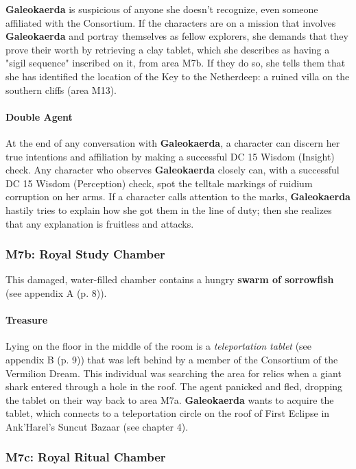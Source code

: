 \documentclass[a4paper, 11pt, bg=full, twocolumn, nooutline]{dndbook}
\begin{document}
\textbf{Galeokaerda} is suspicious of anyone she doesn't recognize, even someone affiliated with the Consortium. If the characters are on a mission that involves \textbf{Galeokaerda} and portray themselves as fellow explorers, she demands that they prove their worth by retrieving a clay tablet, which she describes as having a "sigil sequence" inscribed on it, from area M7b. If they do so, she tells them that she has identified the location of the Key to the Netherdeep: a ruined villa on the southern cliffs (area M13).

\paragraph{Double Agent}

At the end of any conversation with \textbf{Galeokaerda}, a character can discern her true intentions and affiliation by making a successful DC 15 Wisdom (Insight) check. Any character who observes \textbf{Galeokaerda} closely can, with a successful DC 15 Wisdom (Perception) check, spot the telltale markings of ruidium corruption on her arms. If a character calls attention to the marks, \textbf{Galeokaerda} hastily tries to explain how she got them in the line of duty; then she realizes that any explanation is fruitless and attacks.

\subsubsection{M7b: Royal Study Chamber}

This damaged, water-filled chamber contains a hungry \textbf{swarm of sorrowfish} (see appendix A (p. 8)).

\paragraph{Treasure}

Lying on the floor in the middle of the room is a \textit{teleportation tablet} (see appendix B (p. 9)) that was left behind by a member of the Consortium of the Vermilion Dream. This individual was searching the area for relics when a giant shark entered through a hole in the roof. The agent panicked and fled, dropping the tablet on their way back to area M7a. \textbf{Galeokaerda} wants to acquire the tablet, which connects to a teleportation circle on the roof of First Eclipse in Ank'Harel's Suncut Bazaar (see chapter 4).

\subsubsection{M7c: Royal Ritual Chamber}
\end{document}
